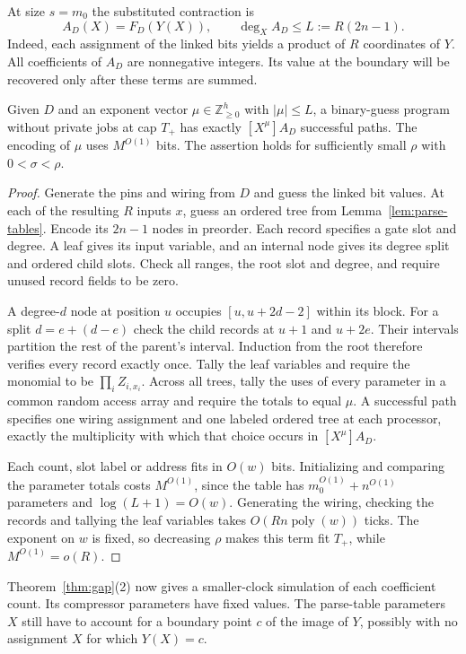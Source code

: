 At size $s=m_0$ the substituted contraction is
\[
 A_D(X)=F_D(Y(X)),\qquad \deg_X A_D\le L:=R(2n-1).
\]
Indeed, each assignment of the linked bits yields a product of $R$
coordinates of $Y$. All coefficients of $A_D$ are nonnegative integers.
Its value at the boundary will be recovered only after these terms
are summed.

\begin{lemma}\label{lem:substitution}
Given $D$ and an exponent vector $\mu\in\mathbb Z_{\ge0}^{h}$ with
$|\mu|\le L$, a binary-guess program without private jobs at cap
$T_+$ has exactly $[X^\mu]A_D$ successful paths. The encoding of
$\mu$ uses $M^{O(1)}$ bits. The assertion holds for sufficiently small
$\rho$ with $0<\sigma<\rho$.
\end{lemma}

\begin{proof}
Generate the pins and wiring from $D$ and guess the linked bit
values. At each of the resulting $R$ inputs $x$, guess an ordered
tree from Lemma~\ref{lem:parse-tables}. Encode its $2n-1$ nodes in
preorder. Each record specifies a gate slot and degree. A leaf gives
its input variable, and an internal node gives its degree split and
ordered child slots. Check all ranges, the root slot and degree, and
require unused record fields to be zero.

A degree-$d$ node at position $u$ occupies $[u,u+2d-2]$ within
its block. For a split $d=e+(d-e)$ check the child records at
$u+1$ and $u+2e$. Their intervals partition the rest of the parent's
interval. Induction from the root therefore verifies every record
exactly once. Tally the leaf variables and require the monomial to be
$\prod_i Z_{i,x_i}$. Across all trees, tally the uses of every
parameter in a common random access array and require the totals
to equal $\mu$. A successful path specifies one wiring assignment and
one labeled ordered tree at each processor, exactly the multiplicity
with which that choice occurs in $[X^\mu]A_D$.

Each count, slot label or address fits in $O(w)$ bits. Initializing and
comparing the parameter totals costs $M^{O(1)}$, since the table has
$m_0^{O(1)}+n^{O(1)}$ parameters and $\log(L+1)=O(w)$. Generating the
wiring, checking the records and tallying the leaf variables takes
$O(Rn\operatorname{poly}(w))$ ticks. The exponent on $w$ is fixed, so
decreasing $\rho$ makes this term fit $T_+$, while $M^{O(1)}=o(R)$.
\end{proof}

Theorem~\ref{thm:gap}(2) now gives a smaller-clock simulation of each
coefficient count. Its compressor parameters have fixed values. The
parse-table parameters $X$ still have to account for a boundary point
$c$ of the image of $Y$, possibly with no assignment $X$ for which
$Y(X)=c$.

